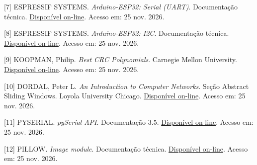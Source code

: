 {\small [7] ESPRESSIF SYSTEMS. \textit{Arduino-ESP32: Serial (UART)}. Documentação técnica. \href{https://docs.espressif.com/projects/arduino-esp32/en/latest/api/serial.html}{Disponível on-line}. Acesso em: 25 nov. 2026.\par}
{\small [8] ESPRESSIF SYSTEMS. \textit{Arduino-ESP32: I2C}. Documentação técnica. \href{https://docs.espressif.com/projects/arduino-esp32/en/latest/api/i2c.html}{Disponível on-line}. Acesso em: 25 nov. 2026.\par}
{\small [9] KOOPMAN, Philip. \textit{Best CRC Polynomials}. Carnegie Mellon University. \href{https://users.ece.cmu.edu/~koopman/crc/}{Disponível on-line}. Acesso em: 25 nov. 2026.\par}
{\small [10] DORDAL, Peter L. \textit{An Introduction to Computer Networks}. Seção Abstract Sliding Windows. Loyola University Chicago. \href{https://intronetworks.cs.luc.edu/current/uhtml/slidingwindows.html}{Disponível on-line}. Acesso em: 25 nov. 2026.\par}
{\small [11] PYSERIAL. \textit{pySerial API}. Documentação 3.5. \href{https://pyserial.readthedocs.io/en/latest/pyserial_api.html}{Disponível on-line}. Acesso em: 25 nov. 2026.\par}
{\small [12] PILLOW. \textit{Image module}. Documentação técnica. \href{https://pillow.readthedocs.io/en/stable/reference/Image.html}{Disponível on-line}. Acesso em: 25 nov. 2026.\par}
